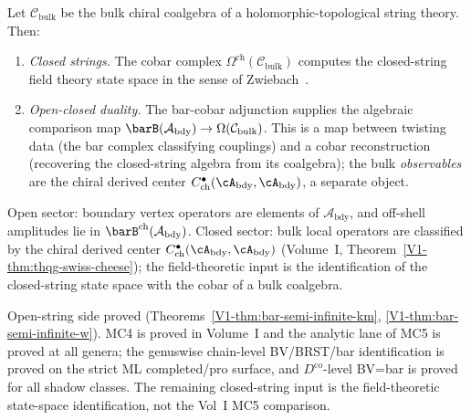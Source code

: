 \begin{remark}
\label{rem:closed-string-cobar}
Let $\mathcal{C}_{\mathrm{bulk}}$ be the bulk chiral coalgebra of
a holomorphic-topological string theory. Then:
\begin{enumerate}
\item \emph{Closed strings.} The cobar complex
 $\Omega^{\mathrm{ch}}(\mathcal{C}_{\mathrm{bulk}})$ computes the
 closed-string field theory state space in the sense of
 Zwiebach~\cite{Zwi93}.
\item \emph{Open-closed duality.} The bar-cobar adjunction
 supplies the algebraic comparison map
 $\barB(\mathcal{A}_{\mathrm{bdy}}) \to
 \Omega(\mathcal{C}_{\mathrm{bulk}})$. This is a map between twisting data
 (the bar complex classifying couplings) and a cobar reconstruction
 (recovering the closed-string algebra from its coalgebra); the bulk
 \emph{observables} are the chiral derived center
 $C^\bullet_{\mathrm{ch}}(\cA_{\mathrm{bdy}},\cA_{\mathrm{bdy}})$,
 a separate object.
\end{enumerate}
\end{remark}

\begin{remark}
Open sector: boundary vertex operators are elements of $\mathcal{A}_{\mathrm{bdy}}$, and off-shell amplitudes lie in $\barB^{\mathrm{ch}}(\mathcal{A}_{\mathrm{bdy}})$. Closed sector: bulk local operators are classified by the chiral derived center $C^\bullet_{\mathrm{ch}}(\cA_{\mathrm{bdy}},\cA_{\mathrm{bdy}})$ (Volume~I, Theorem~\ref*{V1-thm:thqg-swiss-cheese}); the field-theoretic input is the identification of the closed-string state space with the cobar of a bulk coalgebra.
\end{remark}

\begin{remark}
Open-string side proved (Theorems~\ref*{V1-thm:bar-semi-infinite-km}, \ref*{V1-thm:bar-semi-infinite-w}). MC4 is proved in Volume~I and the analytic lane of MC5 is proved at all genera; the genuswise chain-level BV/BRST/bar identification is proved on the strict ML completed/pro surface, and $D^{\mathrm{co}}$-level BV=bar is proved for all shadow classes. The remaining closed-string input is the field-theoretic state-space identification, not the Vol~I MC5 comparison.
\end{remark}

